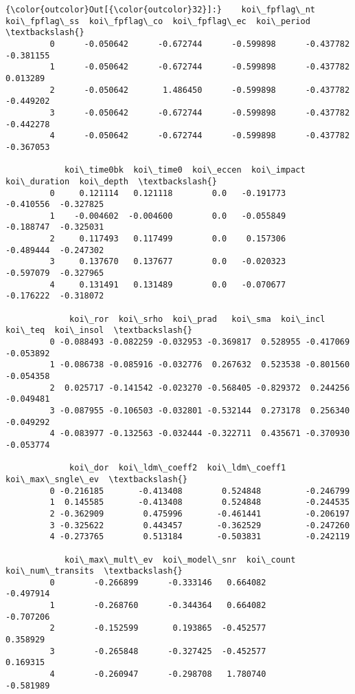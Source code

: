 \documentclass[11pt]{article}
\begin{document}
\begin{Verbatim}[commandchars=\\\{\}]
{\color{outcolor}Out[{\color{outcolor}32}]:}    koi\_fpflag\_nt  koi\_fpflag\_ss  koi\_fpflag\_co  koi\_fpflag\_ec  koi\_period  \textbackslash{}
         0      -0.050642      -0.672744      -0.599898      -0.437782   -0.381155   
         1      -0.050642      -0.672744      -0.599898      -0.437782    0.013289   
         2      -0.050642       1.486450      -0.599898      -0.437782   -0.449202   
         3      -0.050642      -0.672744      -0.599898      -0.437782   -0.442278   
         4      -0.050642      -0.672744      -0.599898      -0.437782   -0.367053   
         
            koi\_time0bk  koi\_time0  koi\_eccen  koi\_impact  koi\_duration  koi\_depth  \textbackslash{}
         0     0.121114   0.121118        0.0   -0.191773     -0.410556  -0.327825   
         1    -0.004602  -0.004600        0.0   -0.055849     -0.188747  -0.325031   
         2     0.117493   0.117499        0.0    0.157306     -0.489444  -0.247302   
         3     0.137670   0.137677        0.0   -0.020323     -0.597079  -0.327965   
         4     0.131491   0.131489        0.0   -0.070677     -0.176222  -0.318072   
         
             koi\_ror  koi\_srho  koi\_prad   koi\_sma  koi\_incl   koi\_teq  koi\_insol  \textbackslash{}
         0 -0.088493 -0.082259 -0.032953 -0.369817  0.528955 -0.417069  -0.053892   
         1 -0.086738 -0.085916 -0.032776  0.267632  0.523538 -0.801560  -0.054358   
         2  0.025717 -0.141542 -0.023270 -0.568405 -0.829372  0.244256  -0.049481   
         3 -0.087955 -0.106503 -0.032801 -0.532144  0.273178  0.256340  -0.049292   
         4 -0.083977 -0.132563 -0.032444 -0.322711  0.435671 -0.370930  -0.053774   
         
             koi\_dor  koi\_ldm\_coeff2  koi\_ldm\_coeff1  koi\_max\_sngle\_ev  \textbackslash{}
         0 -0.216185       -0.413408        0.524848         -0.246799   
         1  0.145585       -0.413408        0.524848         -0.244535   
         2 -0.362909        0.475996       -0.461441         -0.206197   
         3 -0.325622        0.443457       -0.362529         -0.247260   
         4 -0.273765        0.513184       -0.503831         -0.242119   
         
            koi\_max\_mult\_ev  koi\_model\_snr  koi\_count  koi\_num\_transits  \textbackslash{}
         0        -0.266899      -0.333146   0.664082         -0.497914   
         1        -0.268760      -0.344364   0.664082         -0.707206   
         2        -0.152599       0.193865  -0.452577          0.358929   
         3        -0.265848      -0.327425  -0.452577          0.169315   
         4        -0.260947      -0.298708   1.780740         -0.581989   
         

\end{Verbatim}
\end{document}
